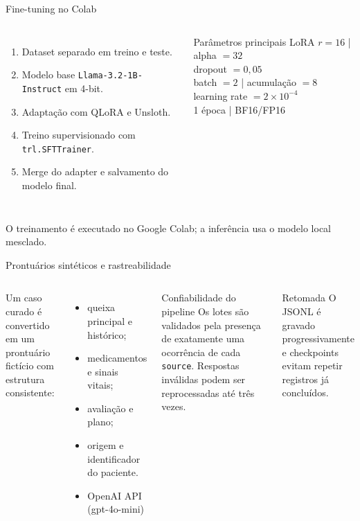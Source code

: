\documentclass[aspectratio=169,11pt]{beamer}
\begin{document}
\begin{frame}{Fine-tuning no Colab}
  \begin{columns}[T,onlytextwidth]
    \begin{enumerate}
      \item Dataset separado em treino e teste.
      \item Modelo base \texttt{Llama-3.2-1B-Instruct} em 4-bit.
      \item Adaptação com QLoRA e Unsloth.
      \item Treino supervisionado com \texttt{trl.SFTTrainer}.
      \item Merge do adapter e salvamento do modelo final.
    \end{enumerate}
    \begin{block}{Parâmetros principais}
      \small
      LoRA $r=16$ | alpha $=32$\\
      dropout $=0{,}05$\\
      batch $=2$ | acumulação $=8$\\
      learning rate $=2\times10^{-4}$\\
      1 época | BF16/FP16
    \end{block}
  \end{columns}
  \vspace{0.25cm}
  \centering\small O treinamento é executado no Google Colab; a inferência usa o modelo local mesclado.
\end{frame}

\begin{frame}{Prontuários sintéticos e rastreabilidade}
  \begin{columns}[T,onlytextwidth]
    Um caso curado é convertido em um prontuário fictício com estrutura consistente:
    \begin{itemize}
      \item queixa principal e histórico;
      \item medicamentos e sinais vitais;
      \item avaliação e plano;
      \item origem e identificador do paciente.
      \item OpenAI API (gpt-4o-mini)
    \end{itemize}
    \begin{block}{Confiabilidade do pipeline}
      Os lotes são validados pela presença de exatamente uma ocorrência de cada \texttt{source}. Respostas inválidas podem ser reprocessadas até três vezes.
    \end{block}
    \begin{block}{Retomada}
      O JSONL é gravado progressivamente e checkpoints evitam repetir registros já concluídos.
    \end{block}
  \end{columns}
\end{frame}
\end{document}
